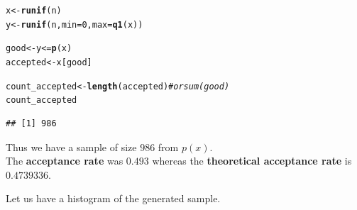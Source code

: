 \documentclass[11pt, a4paper]{article}\usepackage[]{graphicx}\usepackage[]{xcolor}
\makeatletter
\newcommand{\hlnum}[1]{\textcolor[rgb]{0.686,0.059,0.569}{#1}}%
\newcommand{\hlcom}[1]{\textcolor[rgb]{0.678,0.584,0.686}{\textit{#1}}}%
\newcommand{\hlopt}[1]{\textcolor[rgb]{0,0,0}{#1}}%
\newcommand{\hldef}[1]{\textcolor[rgb]{0.345,0.345,0.345}{#1}}%
\newcommand{\hlkwb}[1]{\textcolor[rgb]{0.69,0.353,0.396}{#1}}%
\newcommand{\hlkwc}[1]{\textcolor[rgb]{0.333,0.667,0.333}{#1}}%
\newcommand{\hlkwd}[1]{\textcolor[rgb]{0.737,0.353,0.396}{\textbf{#1}}}%
\newenvironment{kframe}{%
 \def\at@end@of@kframe{}%
 \ifinner\ifhmode%
  \def\at@end@of@kframe{\end{minipage}}%
  \begin{minipage}{\columnwidth}%
 \fi\fi%
 \def\FrameCommand##1{\hskip\@totalleftmargin \hskip-\fboxsep
 \colorbox{shadecolor}{##1}\hskip-\fboxsep
     \hskip-\linewidth \hskip-\@totalleftmargin \hskip\columnwidth}%
 \MakeFramed {\advance\hsize-\width
   \@totalleftmargin\z@ \linewidth\hsize
   \@setminipage}}%
 {\par\unskip\endMakeFramed%
 \at@end@of@kframe}
\newenvironment{knitrout}{}{} %
\makeatother
\begin{document}
\begin{knitrout}
\color{fgcolor}\begin{kframe}
\begin{alltt}
\hldef{x} \hlkwb{<-} \hlkwd{runif}\hldef{(n)}
\hldef{y} \hlkwb{<-} \hlkwd{runif}\hldef{(n,} \hlkwc{min} \hldef{=} \hlnum{0}\hldef{,} \hlkwc{max} \hldef{=} \hlkwd{q1}\hldef{(x))}
\end{alltt}
\end{kframe}
\end{knitrout}

\begin{knitrout}
\color{fgcolor}\begin{kframe}
\begin{alltt}
\hldef{good} \hlkwb{<-} \hldef{y} \hlopt{<=} \hlkwd{p}\hldef{(x)}
\hldef{accepted} \hlkwb{<-} \hldef{x[good]}
\end{alltt}
\end{kframe}
\end{knitrout}

\begin{knitrout}
\color{fgcolor}\begin{kframe}
\begin{alltt}
\hldef{count_accepted} \hlkwb{<-} \hlkwd{length}\hldef{(accepted)} \hlcom{# or sum(good)}
\hldef{count_accepted}
\end{alltt}
\begin{verbatim}
## [1] 986
\end{verbatim}
\end{kframe}
\end{knitrout}

Thus we have a sample of size $986$ from $p(x)$. \\[0.3em]

The \textbf{acceptance rate} was $0.493$ whereas the \textbf{theoretical acceptance rate} is $0.4739336$.

\newpage
Let us have a histogram of the generated sample.
\end{document}
